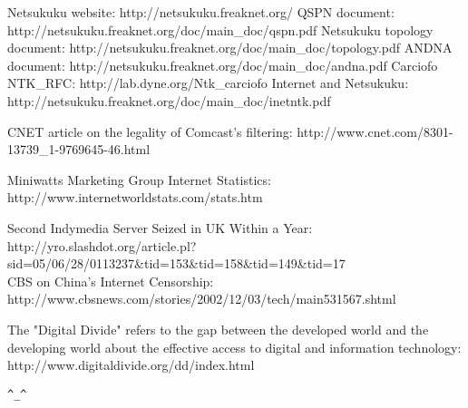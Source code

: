\documentclass[a4paper]{article}
\newcommand{\href}[2]{ #1 }
\begin{document}
\begin{thebibliography}{99}
	 Netsukuku website:
		\href{http://netsukuku.freaknet.org/}{http://netsukuku.freaknet.org/}
	 QSPN document:
		\href{http://netsukuku.freaknet.org/doc/main\_doc/qspn.pdf}{http://netsukuku.freaknet.org/doc/main\_doc/qspn.pdf}
	 Netsukuku topology document:
		\href{http://netsukuku.freaknet.org/doc/main\_doc/topology.pdf}{http://netsukuku.freaknet.org/doc/main\_doc/topology.pdf}
	 ANDNA document:
		\href{http://netsukuku.freaknet.org/doc/main\_doc/andna.pdf}{http://netsukuku.freaknet.org/doc/main\_doc/andna.pdf}
	 Carciofo NTK\_RFC:
		\href{http://lab.dyne.org/Ntk\_carciofo}{http://lab.dyne.org/Ntk\_carciofo}
	  Internet and Netsukuku:
		\href{http://netsukuku.freaknet.org/doc/main\_doc/inetntk.pdf}{http://netsukuku.freaknet.org/doc/main\_doc/inetntk.pdf}

	 CNET article on the legality of Comcast's filtering:
		\href{http://www.cnet.com/8301-13739\_1-9769645-46.html}{http://www.cnet.com/8301-13739\_1-9769645-46.html}

	 Miniwatts Marketing Group Internet Statistics:
		\href{http://www.internetworldstats.com/stats.htm}{http://www.internetworldstats.com/stats.htm}


	  Second Indymedia Server Seized in UK Within a Year:
		\href{http://yro.slashdot.org/article.pl?sid=05/06/28/0113237\&tid=153\&tid=158\&tid=149\&tid=17}{http://yro.slashdot.org/article.pl?sid=05/06/28/0113237\&tid=153\&tid=158\&tid=149\&tid=17} \\
                 CBS on China's Internet Censorship:
		\href{http://www.cbsnews.com/stories/2002/12/03/tech/main531567.shtml}{http://www.cbsnews.com/stories/2002/12/03/tech/main531567.shtml}

         The "Digital Divide" refers to the gap
        between the developed world and the developing world about the
        effective access to digital and information technology:
 		\href{http://www.digitaldivide.org/dd/index.html}{http://www.digitaldivide.org/dd/index.html}
\end{thebibliography}
\newpage

\begin{center}
\verb|^_^|
\end{center}
\end{document}
